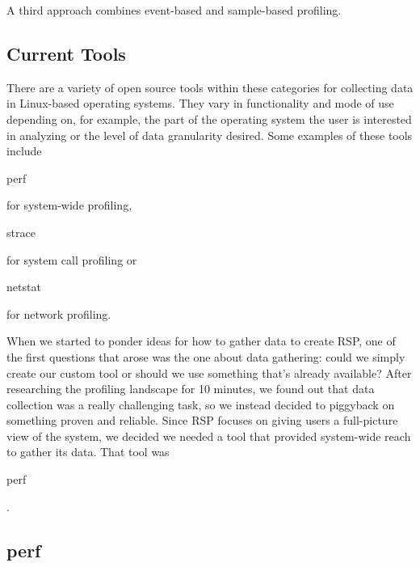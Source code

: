 \documentclass{article}
\begin{document}
A third approach combines event-based and sample-based profiling.

\subsection{Current Tools}

There are a variety of open source tools within these categories for collecting data in Linux-based operating systems. They vary in functionality and mode of use depending on, for example, the part of the operating system the user is interested in analyzing or the level of data granularity desired. Some examples of these tools include \begin{tt}perf\end{tt} for system-wide profiling, \begin{tt}strace\end{tt} for system call profiling or \begin{tt}netstat\end{tt} for network profiling.

When we started to ponder ideas for how to gather data to create RSP, one of the first questions that arose was the one about data gathering: could we simply create our custom tool or should we use something that's already available? After researching the profiling landscape for 10 minutes, we found out that data collection was a really challenging task, so we instead decided to piggyback on something proven and reliable. Since RSP focuses on giving users a full-picture view of the system, we decided we needed a tool that provided system-wide reach to gather its data. That tool was \begin{tt}perf\end{tt}.

\subsection{perf}
\end{document}

